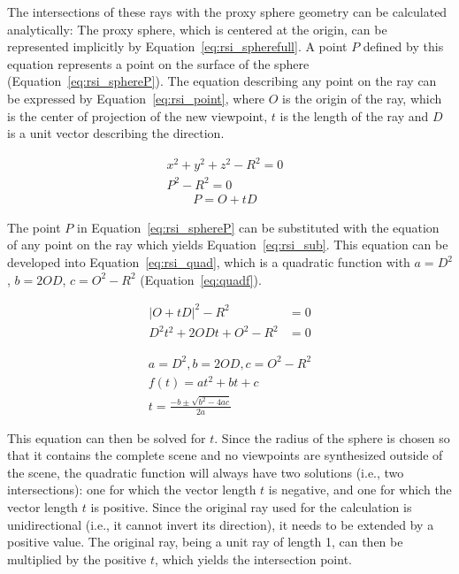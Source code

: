 The intersections of these rays with the proxy sphere geometry can be calculated analytically: The proxy sphere, which is centered at the origin, can be represented implicitly by Equation~\ref{eq:rsi_spherefull}. A point $P$ defined by this equation represents a point on the surface of the sphere (Equation~\ref{eq:rsi_sphereP}). 
The equation describing any point on the ray can be expressed by Equation~\ref{eq:rsi_point}, where $O$ is the origin of the ray, which is the center of projection of the new viewpoint, $t$ is the length of the ray and $D$ is a unit vector describing the direction. 

\begin{align}
  x^2 + y^2 + z^2 - R^2 = 0&\label{eq:rsi_spherefull}\\ 
  P^2 - R^2 = 0&\label{eq:rsi_sphereP}
\end{align} 
\begin{align}
  P = O + tD& \label{eq:rsi_point}
\end{align} 

The point $P$ in Equation~\ref{eq:rsi_sphereP} can be substituted with the equation of any point on the ray which yields Equation~\ref{eq:rsi_sub}. This equation can be developed into Equation~\ref{eq:rsi_quad}, which is a quadratic function with $a = D^2$, $b = 2OD$, $c = O^2-R^2$ (Equation~\ref{eq:quadf}).

\begin{align}
  |O + tD|^2 - R^2 &= 0  \label{eq:rsi_sub}\\
  D^2 t^2 + 2ODt + O^2 - R^2 &= 0 \label{eq:rsi_quad}
\end{align}

\begin{align}
  a = D^2, b = 2OD, c = O^2-R^2 \nonumber \\
  f(t) = at^2 + bt + c \label{eq:quadf}\\
  t = \frac{-b \pm \sqrt{b^2 - 4ac}}{2a} \label{eq:solvequadf}
\end{align}

This equation can then be solved for $t$. Since the radius of the sphere is chosen so that it contains the complete scene and no viewpoints are synthesized outside of the scene, the quadratic function will always have two solutions (i.e., two intersections): one for which the vector length $t$ is negative, and one for which the vector length $t$ is positive. Since the original ray used for the calculation is unidirectional (i.e., it cannot invert its direction), it needs to be extended by a positive value. The original ray, being a unit ray of length 1, can then be multiplied by the positive $t$, which yields the intersection point. 

